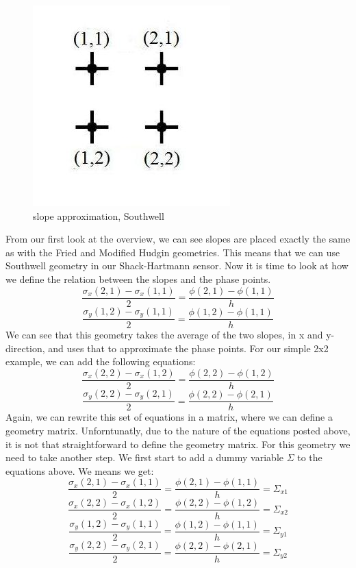 \documentclass{article}
\begin{document}
\begin{figure}[h!]
  \centering
  \includegraphics[scale=0.6]{figures/southwell}
  \caption{slope approximation, Southwell}
\end{figure}
\noindent From our first look at the overview, we can see slopes are placed exactly the same as with the Fried and Modified Hudgin geometries. This means that we can use Southwell geometry in our Shack-Hartmann sensor. 
\newline
\newline
Now it is time to look at how we define the relation between the slopes and the phase points. 
$$ \frac{\sigma_x(2,1)-\sigma_x(1,1)}{2} = \frac{\phi(2,1)-\phi(1,1)}{h}$$
$$ \frac{\sigma_y(1,2)-\sigma_y(1,1)}{2} = \frac{\phi(1,2)-\phi(1,1)}{h}$$
We can see that this geometry takes the average of the two slopes, in x and y-direction, and uses that to approximate the phase points. For our simple 2x2 example, we can add the following equations:
$$ \frac{\sigma_x(2,2)-\sigma_x(1,2)}{2} = \frac{\phi(2,2)-\phi(1,2)}{h}$$
$$ \frac{\sigma_y(2,2)-\sigma_y(2,1)}{2} = \frac{\phi(2,2)-\phi(2,1)}{h}$$
Again, we can rewrite this set of equations in a matrix, where we can define a geometry matrix. 
Unforntunatly, due to the nature of the equations posted above, it is not that straightforward to define the geometry matrix. For this geometry we need to take another step. We first start to add a dummy variable $\varSigma$ to the equations above. We means we get:
$$ \frac{\sigma_x(2,1)-\sigma_x(1,1)}{2} = \frac{\phi(2,1)-\phi(1,1)}{h} = \varSigma_{x1}$$
$$ \frac{\sigma_x(2,2)-\sigma_x(1,2)}{2} = \frac{\phi(2,2)-\phi(1,2)}{h} = \varSigma_{x2}$$
$$ \frac{\sigma_y(1,2)-\sigma_y(1,1)}{2} = \frac{\phi(1,2)-\phi(1,1)}{h} = \varSigma_{y1}$$
$$ \frac{\sigma_y(2,2)-\sigma_y(2,1)}{2} = \frac{\phi(2,2)-\phi(2,1)}{h} = \varSigma_{y2}$$
\end{document}
